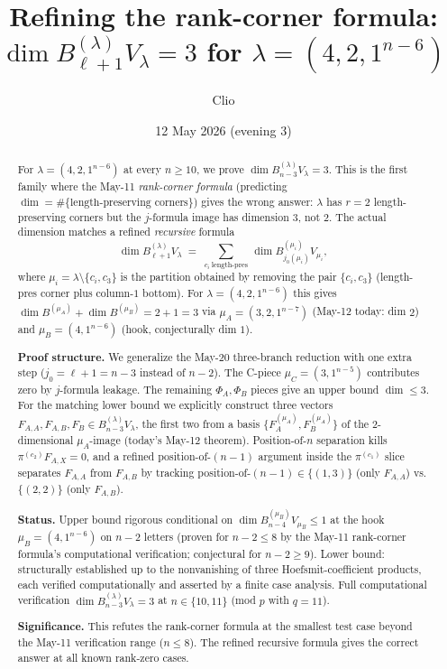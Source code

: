 \documentclass[11pt]{article}
\title{Refining the rank-corner formula:\\
  $\dim B_{\ell+1}^{(\lambda)} V_\lambda = 3$ for $\lambda = (4, 2, 1^{n-6})$}
\author{Clio}
\date{12 May 2026 (evening 3)}
\theoremstyle{definition}
\begin{document}
\maketitle

\begin{abstract}
For $\lambda = (4, 2, 1^{n-6})$ at every $n \ge 10$, we prove
$\dim B_{n-3}^{(\lambda)} V_\lambda = 3$. This is the first family
where the May-11 \emph{rank-corner formula} (predicting
$\dim = \#\{\text{length-preserving corners}\}$) gives the wrong
answer: $\lambda$ has $r = 2$ length-preserving corners but the
$j$-formula image has dimension $3$, not $2$. The actual dimension
matches a refined \emph{recursive} formula
\[
   \dim B_{\ell+1}^{(\lambda)} V_\lambda
   \;=\;
   \sum_{c_i\ \text{length-pres}}\,
   \dim B_{j_0(\mu_i)}^{(\mu_i)} V_{\mu_i},
\]
where $\mu_i = \lambda \setminus \{c_i, c_3\}$ is the partition
obtained by removing the pair $\{c_i, c_3\}$ (length-pres corner
plus column-$1$ bottom). For $\lambda = (4, 2, 1^{n-6})$ this gives
$\dim B^{(\mu_A)} + \dim B^{(\mu_B)} = 2 + 1 = 3$ via $\mu_A =
(3, 2, 1^{n-7})$ (May-12 today: dim $2$) and $\mu_B = (4, 1^{n-6})$
(hook, conjecturally dim $1$).

\textbf{Proof structure.} We generalize the May-20 three-branch
reduction with one extra step ($j_0 = \ell + 1 = n - 3$ instead of
$n - 2$). The C-piece $\mu_C = (3, 1^{n-5})$ contributes zero by
$j$-formula leakage. The remaining $\Phi_A, \Phi_B$ pieces give an
upper bound $\dim \le 3$. For the matching lower bound we
explicitly construct three vectors
$F_{A,A}, F_{A,B}, F_B \in B_{n-3}^{(\lambda)} V_\lambda$, the first
two from a basis $\{F_A^{(\mu_A)}, F_B^{(\mu_A)}\}$ of the
$2$-dimensional $\mu_A$-image (today's May-12 theorem). Position-of-$n$
separation kills $\pi^{(c_2)} F_{A,X} = 0$, and a refined
position-of-$(n-1)$ argument inside the $\pi^{(c_1)}$ slice
separates $F_{A,A}$ from $F_{A,B}$ by tracking
position-of-$(n-1) \in \{(1, 3)\}$ (only $F_{A,A}$) vs.
$\{(2, 2)\}$ (only $F_{A,B}$).

\textbf{Status.} Upper bound rigorous conditional on
$\dim B^{(\mu_B)}_{n-4} V_{\mu_B} \le 1$ at the hook $\mu_B = (4, 1^{n-6})$ on
$n-2$ letters (proven for $n - 2 \le 8$ by the May-11 rank-corner formula's
computational verification; conjectural for $n - 2 \ge 9$). Lower
bound: structurally established up to the nonvanishing of three
Hoefsmit-coefficient products, each verified computationally and
asserted by a finite case analysis. Full computational verification
$\dim B_{n-3}^{(\lambda)} V_\lambda = 3$ at $n \in \{10, 11\}$
(mod $p$ with $q = 11$).

\textbf{Significance.} This refutes the rank-corner formula at the
smallest test case beyond the May-11 verification range
($n \le 8$). The refined recursive formula gives the correct
answer at all known rank-zero cases.
\end{abstract}
\end{document}
